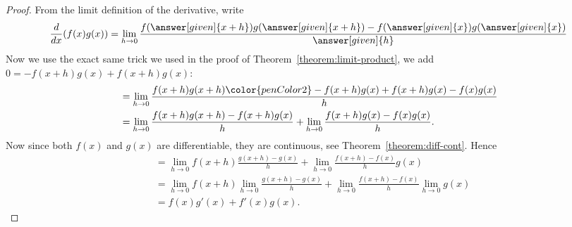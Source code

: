 \documentclass{ximera}
\begin{document}
\begin{image}
\end{image}

\begin{proof}
From the limit definition of the derivative, write
\[
\ddx (f(x)g(x)) = \lim_{h \to0} \frac{f(\answer[given]{x+h})g(\answer[given]{x+h}) - f(\answer[given]{x})g(\answer[given]{x})}{\answer[given]{h}}
\]
Now we use the exact same trick we used in the proof of
Theorem~\ref{theorem:limit-product}, we add $0 = -f(x+h)g(x) + f(x+h)g(x)$:
\begin{align*}
&=\lim_{h \to0} \frac{f(x+h)g(x+h){\color{penColor2}-f(x+h)g(x) + f(x+h)g(x)}- f(x)g(x)}{h} \\ 
&=\lim_{h \to0} \frac{f(x+h)g(x+h)-f(x+h)g(x)}{h} + \lim_{h \to0} \frac{f(x+h)g(x)- f(x)g(x)}{h}.
\end{align*}
Now since both $f(x)$ and $g(x)$ are differentiable, they are
continuous, see Theorem~\ref{theorem:diff-cont}. Hence
\begin{align*}
&=\lim_{h \to0} f(x+h)\frac{g(x+h)-g(x)}{h} + \lim_{h \to0} \frac{f(x+h)- f(x)}{h}g(x) \\ 
&=\lim_{h \to0} f(x+h)\lim_{h \to0}\frac{g(x+h)-g(x)}{h} + \lim_{h \to0} \frac{f(x+h)- f(x)}{h}\lim_{h \to0}g(x) \\ 
&=f(x)g'(x) + f'(x)g(x).
\end{align*}
\end{proof}
\end{document}

